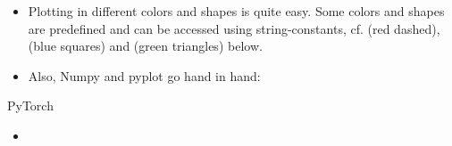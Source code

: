 \begin{frame}
\end{frame}


\begin{frame}
	\begin{itemize}
		\item Plotting in different colors and shapes is quite easy. Some colors and shapes are predefined and can be accessed using string-constants,
			cf.  (red dashed),  (blue squares) and  (green triangles) below.
		\item Also, Numpy and pyplot go hand in hand:
	\end{itemize}
	
	
\end{frame}


\begin{frame}
\end{frame}


\begin{dwHeaderFrame}{PyTorch}
	\begin{itemize}
		\item
	\end{itemize}
\end{dwHeaderFrame}


\makethanks


